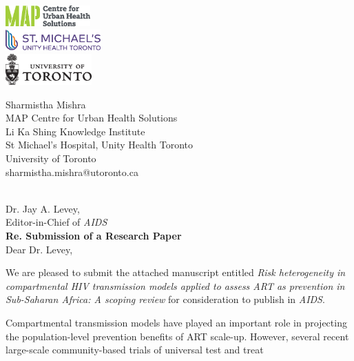 \documentclass{article}
\begin{document}
\begin{minipage}{0.5\linewidth}
  \includegraphics[height=0.8cm]{map-cuhs.eps}\\[1ex]
  \includegraphics[height=0.8cm]{smh.eps}     \\[1ex]
  \includegraphics[height=1.2cm]{uoft.eps}
\end{minipage}%
\begin{minipage}{0.5\linewidth}
  \begin{flushright}\small
    Sharmistha Mishra\\
    MAP Centre for Urban Health Solutions\\
    Li Ka Shing Knowledge Institute\\
    St Michael's Hospital,
    Unity Health Toronto\\
    University of Toronto\\
    sharmistha.mishra@utoronto.ca
  \end{flushright}
\end{minipage}
\\[5ex]
Dr. Jay A. Levey,\\
Editor-in-Chief of \textit{AIDS}\\[2ex]
\textbf{Re. Submission of a Research Paper}\\[1em]
Dear Dr. Levey,  %
\par
We are pleased to submit the attached manuscript entitled
\textit{Risk heterogeneity in compartmental HIV transmission models
  applied to assess ART as prevention in Sub-Saharan Africa: A scoping review}
for consideration to publish in \textit{AIDS}.
\par
Compartmental transmission models have played an important role in projecting
the population-level prevention benefits of ART scale-up.
However, several recent large-scale community-based trials of universal test and treat
\end{document}
